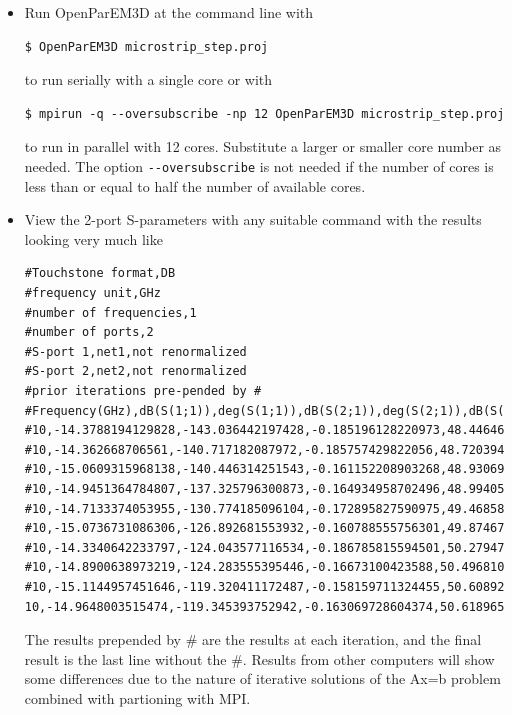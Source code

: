 \documentclass[titlepage]{article}
\renewcommand\_{\textunderscore\linebreak[1]}
\begin{document}
\begin{itemize}
\item Run OpenParEM3D at the command line with
\begin{Verbatim}[fontsize=\small]
   $ OpenParEM3D microstrip_step.proj
\end{Verbatim}
to run serially with a single core or with
\begin{Verbatim}[fontsize=\small]
   $ mpirun -q --oversubscribe -np 12 OpenParEM3D microstrip_step.proj
\end{Verbatim}
to run in parallel with 12 cores.  Substitute a larger or smaller core number as needed.  The option \verb+--oversubscribe+ is not needed if the number of cores is less than or equal to half the number of available cores.
\item View the 2-port S-parameters with any suitable command with the results looking very much like
\begin{Verbatim}[fontsize=\tiny]
#Touchstone format,DB
#frequency unit,GHz
#number of frequencies,1
#number of ports,2
#S-port 1,net1,not renormalized
#S-port 2,net2,not renormalized
#prior iterations pre-pended by #
#Frequency(GHz),dB(S(1;1)),deg(S(1;1)),dB(S(2;1)),deg(S(2;1)),dB(S(1;2)),deg(S(1;2)),dB(S(2;2)),deg(S(2;2))
#10,-14.3788194129828,-143.036442197428,-0.185196128220973,48.4464694369318,-0.185196128220973,48.4464694369318,-14.3755919817412,59.8969360333806
#10,-14.362668706561,-140.717182087972,-0.185757429822056,48.7203941057591,-0.185757429822056,48.7203941057591,-14.3605686334538,58.1152503635806
#10,-15.0609315968138,-140.446314251543,-0.161152208903268,48.9306989849119,-0.161152208903268,48.9306989849119,-15.0598550941328,58.2646381098206
#10,-14.9451364784807,-137.325796300873,-0.164934958702496,48.9940535036704,-0.164934958702496,48.9940535036704,-14.9442860056249,55.2642922102583
#10,-14.7133374053955,-130.774185096104,-0.172895827590975,49.4685808388707,-0.172895827590975,49.4685808388707,-14.7098431887646,49.664383434521
#10,-15.0736731086306,-126.892681553932,-0.160788555756301,49.8746771388686,-0.160788555756301,49.8746771388686,-15.0675315888474,46.6021770759152
#10,-14.3340642233797,-124.043577116534,-0.186785815594501,50.2794740952806,-0.186785815594501,50.2794740952806,-14.3297637712834,44.5637330342644
#10,-14.8900638973219,-124.283555395446,-0.16673100423588,50.4968103406548,-0.16673100423588,50.4968103406548,-14.8857288440341,45.2485990207109
#10,-15.1144957451646,-119.320411172487,-0.158159711324455,50.6089280321123,-0.158159711324455,50.6089280321123,-15.1098168809666,40.5542876526387
10,-14.9648003515474,-119.345393752942,-0.163069728604374,50.618965517188,-0.163069728604374,50.618965517188,-14.9590784928379,40.6098185523797
\end{Verbatim}
The results prepended by \# are the results at each iteration, and the final result is the last line without the \#.  Results from other computers will show some differences due to the nature of iterative solutions of the Ax=b problem combined with partioning with MPI.


\end{itemize}
\end{document}
